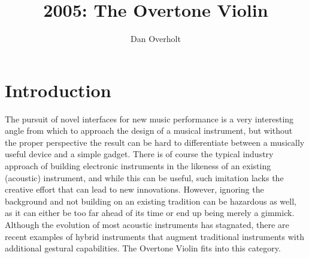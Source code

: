 
\graphicspath{ {mainmatter/Overholt_2005/} }
\title*{2005: The Overtone Violin}

\author{Dan Overholt}

%
%
\maketitle


\section{Introduction}

The pursuit of novel interfaces for new music performance is a very interesting
angle from which to approach the design of a musical instrument, but without the
proper perspective the result can be hard to differentiate between a musically
useful device and a simple gadget. There is of course the typical industry
approach of building electronic instruments in the likeness of an existing
(acoustic) instrument, and while this can be useful, such imitation lacks the
creative effort that can lead to new innovations. However, ignoring the
background and not building on an existing tradition can be hazardous as well, as
it can either be too far ahead of its time or end up being merely a gimmick.
Although the evolution of most acoustic instruments has stagnated, there are
recent examples of hybrid instruments \cite{Bongers:1994,Burtner:1994,Machover:1992a} that augment traditional
instruments with additional gestural capabilities. The Overtone Violin fits into
this category.

